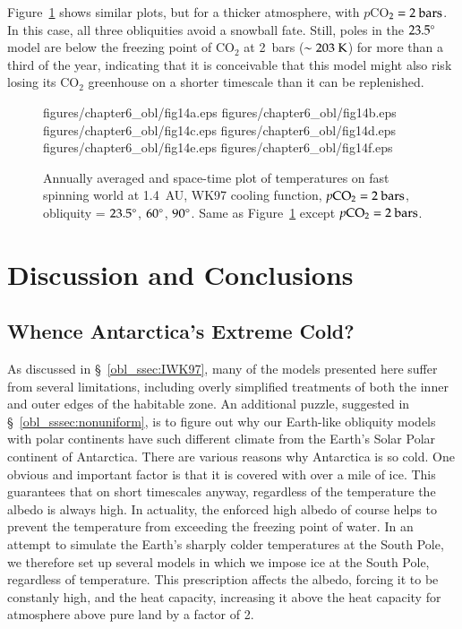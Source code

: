 Figure~\ref{obl_fig:set42_23p5_60_90} shows similar plots, but for a
thicker atmosphere, with $p$CO$_2=2\rm~bars$.  In this case, all three
obliquities avoid a snowball fate.  Still, poles in the $23.5\degr$
model are below the freezing point of CO$_2$ at 2~bars ($\sim 203
\rm~K$) for more than a third of the year, indicating that it is
conceivable that this model might also risk losing its CO$_2$
greenhouse on a shorter timescale than it can be replenished.

\begin{figure}[p]
\plottwo
{figures/chapter6_obl/fig14a.eps}
{figures/chapter6_obl/fig14b.eps}\\
\plottwo
{figures/chapter6_obl/fig14c.eps}
{figures/chapter6_obl/fig14d.eps}\\
\plottwo
{figures/chapter6_obl/fig14e.eps}
{figures/chapter6_obl/fig14f.eps}
\caption[Annually averaged and space-time plot of temperatures on fast
spinning world at 1.4~AU, WK97 cooling function, $p\rm CO_2 = 2~bars$,
obliquity = $23.5\degr$, $60\degr$, $90\degr$.]{Annually averaged and
    space-time plot of temperatures on fast spinning world at 1.4~AU,
    WK97 cooling function, $p\rm CO_2 = 2~bars$, obliquity =
    $23.5\degr$, $60\degr$, $90\degr$.  Same as
    Figure~\ref{obl_fig:set42_23p5_60_90} except $p\rm CO_2 =
    2~bars$.}
\label{obl_fig:set42_23p5_60_90}
\end{figure}

\afterpage{\clearpage}


\section{Discussion and Conclusions}
\label{obl_sec:disc+conc}

\subsection{Whence Antarctica's Extreme Cold?}
\label{obl_ssec:cold_SP?}

As discussed in \S~\ref{obl_ssec:IWK97}, many of the models presented
here suffer from several limitations, including overly simplified
treatments of both the inner and outer edges of the habitable zone.
An additional puzzle, suggested in \S~\ref{obl_sssec:nonuniform}, is
to figure out why our Earth-like obliquity models with polar
continents have such different climate from the Earth's Solar Polar
continent of Antarctica.  There are various reasons why Antarctica is
so cold.  One obvious and important factor is that it is covered with
over a mile of ice.  This guarantees that on short timescales anyway,
regardless of the temperature the albedo is always high.  In
actuality, the enforced high albedo of course helps to prevent the
temperature from exceeding the freezing point of water.  In an attempt
to simulate the Earth's sharply colder temperatures at the South Pole,
we therefore set up several models in which we impose ice at the South
Pole, regardless of temperature.  This prescription affects the
albedo, forcing it to be constanly high, and the heat capacity,
increasing it above the heat capacity for atmosphere above pure land
by a factor of 2.

